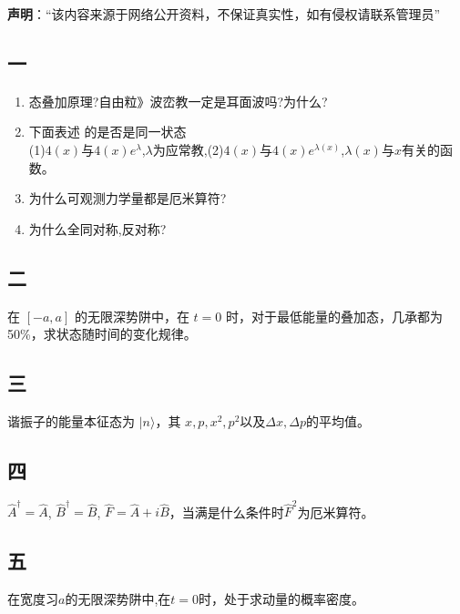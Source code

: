 
\textbf{声明}：“该内容来源于网络公开资料，不保证真实性，如有侵权请联系管理员”

\subsection{一}
\begin{enumerate}
\item 态叠加原理?自由粒》波峦教一定是耳面波吗?为什么?
\item 下面表述 的是否是同一状态\\
(1)$4(x)$与$4(x)e^\lambda$,$\lambda$为应常教,(2)$4(x)$与$4(x)e^{\lambda(x)}$,$\lambda(x)$与$x$有关的函数。
\item 为什么可观测力学量都是厄米算符?
\item 为什么全同对称,反对称?
\end{enumerate}
\subsection{二}
在 $[-a, a]$ 的无限深势阱中，在 $t=0$ 时，对于最低能量的叠加态，几承都为50\%，求状态随时间的变化规律。
\subsection{三}
谐振子的能量本征态为 $\lvert n \rangle$，其 $x,p,x^2,p^2$以及$\Delta x,\Delta p$的平均值。
\subsection{四}
 $\hat{A}^\dagger = \hat{A}$, $\hat{B}^\dagger = \hat{B}$, $\hat{F} = \hat{A} + i\hat{B}$，当满是什么条件时$\hat{F}^2$为厄米算符。
\subsection{五}
在宽度习$a$的无限深势阱中,在$t=0$时，处于求动量的概率密度。